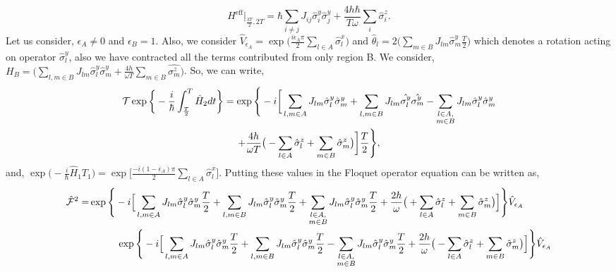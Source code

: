 \documentclass[%
reprint,
superscriptaddress,
amsmath,amssymb,showkeys,
aps,
prb,
]{revtex4-2}
\begin{document}
	\begin{equation}
		H^{\mathrm{eff}}\vert_{\frac{3T}{2}, 2T} = \hbar\sum_{i\neq j} J_{ij} \hat{\sigma}^y_i \hat{\sigma}^y_{j} + \frac{4h\hbar}{T \omega}\sum_i\hat{\sigma}^z_i.
	\end{equation} 
	Let us consider, $\epsilon_A \neq 0$ and $\epsilon_B=1$. Also, we consider $\displaystyle \hat{V}_{\epsilon_A} = \exp\Big(\frac{i\epsilon_A \pi}{2}\sum_{l\in A}\hat{\sigma}^x_l\Big)$  and $\displaystyle \hat{\theta}_l = 2 \Big(\sum_{m \in B}J_{lm}\hat{\sigma}^y_m \frac{T}{2} \Big)$ which denotes a rotation acting on operator $\hat{\sigma}^y_l$, also we have contracted all the terms contributed from only region B. We consider, $\displaystyle {H}_B = \Big(\sum_{l,m\in B} J_{lm} \hat{\sigma}^y_l\hat{\sigma}^y_m + \frac{4h}{\omega T}\sum_{m \in B}\hat{\sigma^z_m}\Big)$. So, we can write,		
	\begin{multline}
		\mathcal{T}\exp\bigg\{-\frac{i}{\hbar}\int_{\frac{T}{2}}^{T} \hat{H}_2 dt\bigg\} = \exp\Bigg\{-i \bigg[ \sum_{l,m\in A}J_{lm} \hat{\sigma}_l^y\hat{\sigma}_m^y +\sum_{l,m\in B}J_{lm}
		\hat{\sigma_l^y}\hat{\sigma_m^y}-\sum_{\substack{%
				l \in A,\\
				m \in B\hfill}} J_{lm}\hat{\sigma}^y_l\hat{\sigma}^y_m\\+\frac{4h}{\omega T}\big( -\sum_{l\in A}^{}\hat{\sigma}^z_l + \sum_{m\in B}^{}\hat{\sigma}^z_m\big)\bigg]\frac{T}{2}\Bigg\},
	\end{multline}	
	and, $\displaystyle 
	\exp\Big(-\frac{i}{\hbar} \hat{H}_1 T_1\Big) = \exp\Bigg[\frac{-i(1-\epsilon_A)\pi}{2}\sum_{l \in A}\hat{\sigma}^x_l\Bigg].$
	Putting these values in the Floquet operator equation can be written as,    	
	\begin{align}
		\hat{\mathcal{F}}^2 
		=& \exp\Bigg\{-i \Big[ \sum_{l,m\in A}J_{lm} \hat{\sigma}^y_l\hat{\sigma}^y_m\frac{T}{2} +\sum_{l,m\in B}J_{lm} \hat{\sigma}^y_l\hat{\sigma}^y_m\frac{T}{2}+\sum_{\substack{%
				l \in A,\\
				m \in B\hfill}} J_{lm}\hat{\sigma}^y_l\hat{\sigma}^y_m\frac{T}{2} +\frac{2h}{\omega }\big( +\sum_{l\in A}^{}\hat{\sigma}^z_l + \sum_{m\in B}^{}\hat{\sigma}^z_m\big)\Big]\Bigg\} \hat{V}_{\epsilon_A} \nonumber\\
		& \hspace{1 cm}\exp\Bigg\{-i \Big[ \sum_{l,m\in A}J_{lm} \hat{\sigma}^y_l\hat{\sigma}^y_m\frac{T}{2} +\sum_{l,m\in B}J_{lm} \hat{\sigma}^y_l\hat{\sigma}^y_m\frac{T}{2}-\sum_{\substack{%
				l \in A,\\
				m \in B\hfill}} J_{lm}\hat{\sigma}^y_l\hat{\sigma}^y_m\frac{T}{2} +\frac{2h}{\omega}\big( -\sum_{l\in A}^{}\hat{\sigma}^z_l + \sum_{m\in B}^{}\hat{\sigma}^z_m\big)\Big]\Bigg\} \hat{V}_{\epsilon_A}\nonumber
		\end{align}
\end{document}
